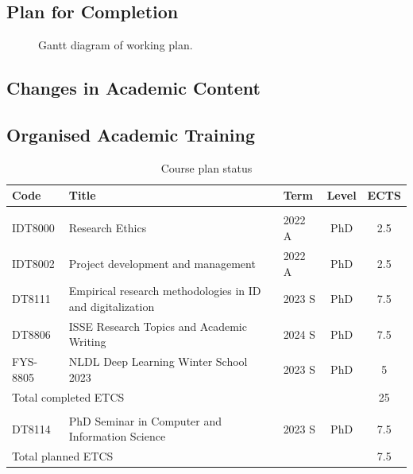 \documentclass[12pt]{book}
\begin{document}
\subsection{Plan for Completion}
\lipsum[1-2]
\begin{figure}[htpb]
	\clearpage
	
	\caption{Gantt diagram of working plan.}
	\label{fig:gantt-diagram-progress-plan}
\end{figure}


\subsection{Changes in Academic Content}


\subsection{Organised Academic Training}


\begin{table}[htp]
    \newcommand\T{\rule{0pt}{2.6ex}}       %
    \newcommand\B{\rule[-1.2ex]{0pt}{0pt}} %
    \centering
    \caption{Course plan status}
    \label{tab:my_label}
    
    \begin{tabularx}{\textwidth}{Xllcc}
        \toprule
        \textbf{Code} & \textbf{Title} & \textbf{Term} & \textbf{Level} & \textbf{ECTS}\\
        \midrule
        \multicolumn{5}{l}{\cellcolor{green!20}{\textbf{Completed}}} \bigstrut\\
        \T IDT8000 & Research Ethics & 2022 A & PhD & 2.5\\
        IDT8002 & Project development and management & 2022 A & PhD & 2.5\\
        DT8111 & Empirical research methodologies in ID and digitalization & 2023 S & PhD & 7.5\\
        DT8806 & ISSE Research Topics and Academic Writing & 2024 S & PhD & 7.5\\
        FYS-8805 & NLDL Deep Learning Winter School 2023 & 2023 S & PhD & 5\\
        \midrule
        \multicolumn{4}{l}{Total completed ETCS} & 25\\
        \midrule
        \midrule
        \multicolumn{5}{l}{\cellcolor{yellow!20}{\textbf{Planned}}} \bigstrut\\
        \T DT8114 & PhD Seminar in Computer and Information Science & 2023 S & PhD & 7.5\\
        \midrule
        \multicolumn{4}{l}{Total planned ETCS} & 7.5\\
        \midrule
        \bottomrule
    \end{tabularx}
\end{table}
\end{document}
